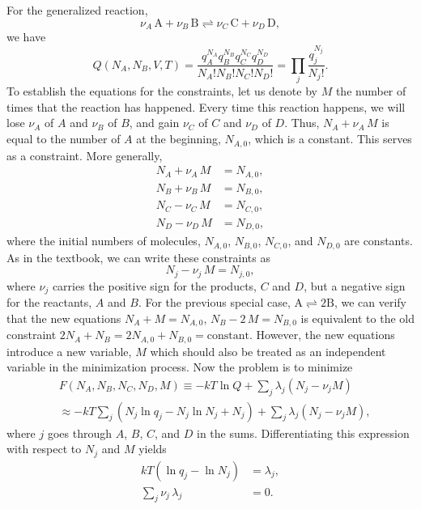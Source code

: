 \documentclass[twocolumn, 10pt]{article}
\numberwithin{equation}{section}
\newenvironment{solution}[1][\empty]
{\par\medskip\sffamily
  \textbf{\ifx\empty#1{Solution.}\relax\else{#1}\fi} \ignorespaces}
{\medskip}
\begin{document}
\begin{solution}
  For the generalized reaction,
  $$
  \nu_A \, \mathrm{A} + \nu_B \, \mathrm{B}
  \rightleftharpoons
  \nu_C \, \mathrm{C} + \nu_D \, \mathrm{D},
  $$
  we have
  $$
  Q(N_A, N_B, V, T)
  =
  \frac{ q_A^{N_A} q_B^{N_B} q_C^{N_C} q_D^{N_D} }
  { N_A! N_B! N_C! N_D!}
  =
  \prod_j \frac{ q_j^{N_j} } { N_j! }.
  $$
  To establish the equations for the constraints,
  let us denote by $M$ the number of times that the reaction has happened.
  Every time this reaction happens,
  we will lose $\nu_A$ of $A$ and $\nu_B$ of $B$,
  and gain $\nu_C$ of $C$ and $\nu_D$ of $D$.
  Thus, $N_A + \nu_A \, M$ is equal to the number of $A$ at the beginning,
  $N_{A,0}$, which is a constant.
  This serves as a constraint.
  More generally,
  \begin{align*}
    N_A + \nu_A \, M &= N_{A,0}, \\
    N_B + \nu_B \, M &= N_{B,0}, \\
    N_C - \nu_C \, M &= N_{C,0}, \\
    N_D - \nu_D \, M &= N_{D,0},
  \end{align*}
  where the initial numbers of molecules,
  $N_{A,0}$, $N_{B,0}$, $N_{C,0}$, and $N_{D,0}$ are constants.
  As in the textbook, we can write these constraints as
  $$
  N_j - \nu_j \, M = N_{j,0},
  $$
  where $\nu_j$ carries the positive sign for the products, $C$ and $D$,
  but a negative sign for the reactants, $A$ and $B$.
  For the previous special case, $\mathrm{A} \rightleftharpoons 2\mathrm{B}$,
  we can verify that the new equations
  $N_A + M = N_{A,0}$, $N_B - 2 \, M = N_{B,0}$
  is equivalent to the old constraint
  $2 N_A + N_B = 2 N_{A, 0} + N_{B,0} = \mathrm{constant}$.
  However, the new equations introduce a new variable, $M$
  which should also be treated as an independent variable
  in the minimization process.
  Now the problem is to minimize
  \begin{align*}
    &F(N_A, N_B, N_C, N_D, M)
    \equiv -k T \ln Q
    + \sum_j\lambda_j (N_j - \nu_j M)
    \\
    &\approx
    -kT \sum_j (N_j \ln q_j - N_j \ln N_j + N_j)
    + \sum_j \lambda_j (N_j - \nu_j M)
    ,
  \end{align*}
  where $j$ goes through $A$, $B$, $C$, and $D$ in the sums.
%
  Differentiating this expression with respect to $N_j$ and $M$ yields
  \begin{align*}
    kT (\ln q_j - \ln N_j) &= \lambda_j, \\
    \sum_{j}
    \nu_j \, \lambda_j
    &=
    0
    .
  \end{align*}

\end{solution}
\end{document}
